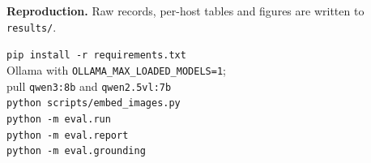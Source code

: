 \documentclass[conference]{IEEEtran}
\begin{document}
\textbf{Reproduction.} Raw records, per-host tables and figures are written to \texttt{results/}.
\begin{flushleft}\footnotesize
\texttt{pip install -r requirements.txt}\\
Ollama with \texttt{OLLAMA\_MAX\_LOADED\_MODELS=1};\\
pull \texttt{qwen3:8b} and \texttt{qwen2.5vl:7b}\\
\texttt{python scripts/embed\_images.py}\\
\texttt{python -m eval.run}\\
\texttt{python -m eval.report}\\
\texttt{python -m eval.grounding}
\end{flushleft}
\end{document}
